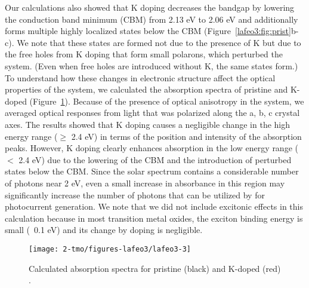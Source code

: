 Our calculations also showed that K doping decreases the bandgap by lowering the conduction band minimum (CBM) from 2.13 eV to 2.06 eV and additionally forms multiple highly localized states below the CBM (Figure~\ref{lafeo3:fig:prist}b-c). We note that these states are formed not due to the presence of K but due to the free holes from K doping that form small polarons, which perturbed the system. (Even when free holes are introduced without K, the same states form.) To understand how these changes in electronic structure affect the optical properties of the system, we calculated the absorption spectra of pristine and K-doped  (Figure~\ref{lafeo3:fig:optical}). Because of the presence of optical anisotropy in the system, we averaged optical responses from light that was polarized along the a, b, c crystal axes. The results showed that K doping causes a negligible change in the high energy range ($\geq$ 2.4 eV) in terms of the position and intensity of the absorption peaks. However, K doping clearly enhances absorption in the low energy range ($<$ 2.4 eV) due to the lowering of the CBM and the introduction of perturbed states below the CBM. Since the solar spectrum contains a considerable number of photons near 2 eV, even a small increase in absorbance in this region may significantly increase the number of photons that can be utilized by  for photocurrent generation. We note that we did not include excitonic effects in this calculation because in most transition metal oxides, the exciton binding energy is small (~0.1 eV) and its change by doping is negligible.~\cite{kim2015simultaneous,ping2013,ping2014optimizing}


\begin{figure}
    \centering
    \texttt{[image: 2-tmo/figures-lafeo3/lafeo3-3]}
    \caption{
        Calculated absorption spectra for pristine (black) and K-doped (red) .
    }
    \label{lafeo3:fig:optical}
\end{figure}

